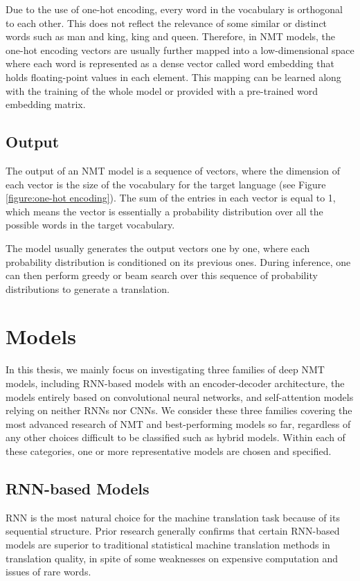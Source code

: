 Due to the use of one-hot encoding, every word in the vocabulary is orthogonal to each other. This does not reflect the relevance of some similar or distinct words such as man and king, king and queen. Therefore, in NMT models, the one-hot encoding vectors are usually further mapped into a low-dimensional space where each word is represented as a dense vector called word embedding that holds floating-point values in each element. This mapping can be learned along with the training of the whole model or provided with a pre-trained word embedding matrix.

\subsection{Output}

The output of an NMT model is a sequence of vectors, where the dimension of each vector is the size of the vocabulary for the target language (see Figure \ref{figure:one-hot encoding}). The sum of the entries in each vector is equal to 1, which means the vector is essentially a probability distribution over all the possible words in the target vocabulary. 

The model usually generates the output vectors one by one, where each probability distribution is conditioned on its previous ones. During inference, one can then perform greedy or beam search over this sequence of probability distributions to generate a translation.


\section{Models} \label{section:models}

In this thesis, we mainly focus on investigating three families of deep NMT models, including RNN-based models with an encoder-decoder architecture, the models entirely based on convolutional neural networks, and self-attention models relying on neither RNNs nor CNNs. We consider these three families covering the most advanced research of NMT and best-performing models so far, regardless of any other choices difficult to be classified such as hybrid models. Within each of these categories, one or more representative models are chosen and specified.

\subsection{RNN-based Models}

RNN is the most natural choice for the machine translation task because of its sequential structure. Prior research generally confirms that certain RNN-based models are superior to traditional statistical machine translation methods in translation quality, in spite of some weaknesses on expensive computation and issues of rare words. 

